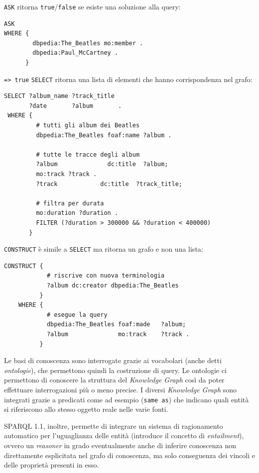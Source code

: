 \documentclass[11pt]{article}
\begin{document}
\verb|ASK| ritorna \verb|true|/\verb|false| se esiste una soluzione alla query:
\begin{lstlisting}[language=sparql]
  ASK
WHERE {
        dbpedia:The_Beatles mo:member .
        dbpedia:Paul_McCartney .
      }
\end{lstlisting}
\verb|=> true| \newline
\verb|SELECT| ritorna una lista di elementi che hanno corrispondenza nel grafo:
\begin{lstlisting}[language=sparql]
SELECT ?album_name ?track_title
       ?date       ?album       .
 WHERE {
         # tutti gli album dei Beatles
         dbpedia:The_Beatles foaf:name ?album .

         # tutte le tracce degli album
         ?album              dc:title  ?album;
         mo:track ?track .
         ?track            dc:title  ?track_title;

         # filtra per durata
         mo:duration ?duration .
         FILTER (?duration > 300000 && ?duration < 400000)
       }
\end{lstlisting}

\verb|CONSTRUCT| è simile a \verb|SELECT| ma ritorna un grafo e non una lista:
\begin{lstlisting}[language=sparql]
CONSTRUCT {
            # riscrive con nuova terminologia
            ?album dc:creator dbpedia:The_Beatles
          }
    WHERE {
            # esegue la query
            dbpedia:The_Beatles foaf:made   ?album;
            ?album              mo:track    ?track .
          }
\end{lstlisting}
  
Le basi di conoscenza sono interrogate grazie ai vocabolari (anche detti \textit{ontologie}), che permettono quindi la costruzione di query. Le ontologie ci permettono di conoscere la struttura del \textit{Knowledge Graph} così da poter effettuare interrogazioni più o meno precise. I diversi \textit{Knowledge Graph} sono integrati grazie a predicati come ad esempio (\verb|same as|) che indicano quali entità si riferiscono allo stesso oggetto reale nelle varie fonti.

SPARQL 1.1, inoltre, permette di integrare un sistema di ragionamento automatico per l'uguaglianza delle entità (introduce il concetto di \textit{entailment}), ovvero un \textit{reasoner} in grado eventualmente anche di inferire conoscenza non direttamente esplicitata nel grafo di conoscenza, ma solo conseguenza dei vincoli e delle proprietà presenti in esso.
\end{document}
